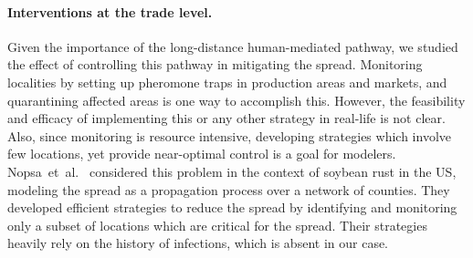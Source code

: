 \documentclass[11pt]{article}
\theoremstyle{definition}
\begin{document}

\paragraph{Interventions at the trade level.}
Given the importance of the long-distance human-mediated pathway, we
studied the effect of controlling this pathway in mitigating the spread.
Monitoring localities by setting up pheromone traps in production areas and
markets, and quarantining affected areas is one way to accomplish this.
However, the feasibility and efficacy of implementing this or any other
strategy in real-life is not clear. Also, since monitoring is resource intensive,
developing strategies which involve few locations, yet provide near-optimal
control is a goal for modelers. Nopsa~et~al.~\cite{nopsa2015ecological}
considered this problem in the context of soybean rust in the US, modeling
the spread as a propagation process over a network of counties. They
developed efficient strategies to reduce the spread by identifying and
monitoring only a subset of locations which are critical for the spread.
Their strategies heavily rely on the history of infections, which is absent
in our case.
\end{document}
